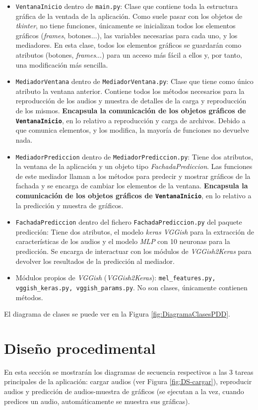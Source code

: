 \begin{itemize}
\item \texttt{VentanaInicio} dentro de \texttt{main.py}: Clase que contiene toda la estructura gráfica de la ventada de la aplicación. Como suele pasar con los objetos de \textit{tkinter}, no tiene funciones, únicamente se inicializan todos los elementos gráficos (\textit{frames}, botones...), las variables necesarias para cada uno, y los mediadores. En esta clase, todos los elementos gráficos se guardarán como atributos (botones, \textit{frames}...) para un acceso más fácil a ellos y, por tanto, una modificación más sencilla.
\item \texttt{MediadorVentana} dentro de \texttt{MediadorVentana.py}: Clase que tiene como único atributo la ventana anterior. Contiene todos los métodos necesarios para la reproducción de los audios y muestra de detalles de la carga y reproducción de los mismos. \textbf{Encapsula la comunicación de los objetos gráficos de \texttt{VentanaInicio}}, en lo relativo a reproducción y carga de archivos. Debido a que comunica elementos, y los modifica, la mayoría de funciones no devuelve nada.
\item \texttt{MediadorPrediccion} dentro de \texttt{MediadorPrediccion.py}: Tiene dos atributos, la ventana de la aplicación y un objeto tipo \textit{FachadaPrediccion}. Las funciones de este mediador llaman a los métodos para predecir y mostrar gráficos de la fachada y se encarga de cambiar los elementos de la ventana. \textbf{Encapsula la comunicación de los objetos gráficos de \texttt{VentanaInicio}}, en lo relativo a la predicción y muestra de gráficos.
\item \texttt{FachadaPrediccion} dentro del fichero \texttt{FachadaPrediccion.py} del paquete predicción: Tiene dos atributos, el modelo \textit{keras VGGish} para la extracción de características de los audios y el modelo \textit{MLP} con 10 neuronas para la predicción. Se encarga de interactuar con los módulos de \textit{VGGish2Keras} para devolver los resultados de la predicción al mediador.
\item Módulos propios de \textit{VGGish} (\textit{VGGish2Keras}): \texttt{mel\_features.py, vggish\_keras.py, vggish\_params.py}. No son clases, únicamente contienen métodos.
\end{itemize}
El diagrama de clases se puede ver en la Figura \ref{fig:DiagramaClasesPDD}. 



\section{Diseño procedimental}
En esta sección se mostrarán los diagramas de secuencia respectivos a las 3 tareas principales de la aplicación: cargar audios (ver Figura \ref{fig:DS-cargar}), reproducir audios y predicción de audios-muestra de gráficos (se ejecutan a la vez, cuando predices un audio, automáticamente se muestra sus gráficas).
